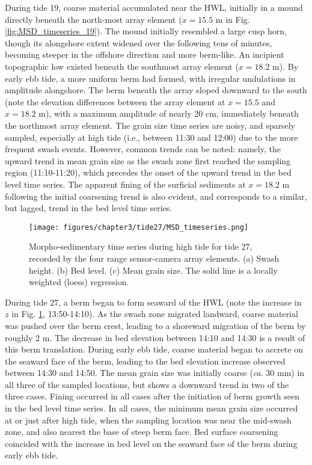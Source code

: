 During tide 19, coarse material accumulated near the HWL, initially in a mound directly beneath the north-most array element ($x=15.5$ m in Fig. \ref{fig:MSD_timeseries_19}). The mound initially resembled a large cusp horn, though its alongshore extent widened over the following tens of minutes, becoming steeper in the offshore direction and more berm-like. An incipient topographic low existed beneath the southmost array element ($x=18.2$ m). By early ebb tide, a more uniform berm had formed, with irregular undulations in amplitude alongshore. The berm beneath the array sloped downward to the south (note the elevation differences between the array element at $x=15.5$ and $x=18.2$ m), with a maximum amplitude of nearly 20 cm, immediately beneath the northmost array element. The grain size time series are noisy, and sparsely sampled, especially at high tide (i.e., between 11:30 and 12:00) due to the more frequent swash events. However, common trends can be noted: namely, the upward trend in mean grain size as the swash zone first reached the sampling region (11:10-11:20), which precedes the onset of the upward trend in the bed level time series. The apparent fining of the surficial sediments at $x=18.2$ m following the initial coarsening trend is also evident, and corresponds to a similar, but lagged, trend in the bed level time series.

\begin{figure}[tbp] %
  	\texttt{[image: figures/chapter3/tide27/MSD\_timeseries.png]}
 	\caption[Time series of swash zone bed level and mean grain size, tide 27]{Morpho-sedimentary time series during high tide for tide 27, recorded by the four range sensor-camera array elements. (a) Swash height. (b) Bed level. (c) Mean grain size. The solid line is a locally weighted (loess) regression.}
 	\label{fig:MSD_timeseries_27}
\end{figure}

During tide 27, a berm began to form seaward of the HWL (note the increase in $z$ in Fig. \ref{fig:MSD_timeseries_27}, 13:50-14:10). As the swash zone migrated landward, coarse material was pushed over the berm crest, leading to a shoreward migration of the berm by roughly 2 m. The decrease in bed elevation between 14:10 and 14:30 is a result of this berm translation. During early ebb tide, coarse material began to accrete on the seaward face of the berm, leading to the bed elevation increase observed between 14:30 and 14:50. The mean grain size was initially coarse (\textit{ca}. 30 mm) in all three of the sampled locations, but shows a downward trend in two of the three cases. Fining occurred in all cases after the initiation of berm growth seen in the bed level time series. In all cases, the minimum mean grain size occurred at or just after high tide, when the sampling location was near the mid-swash zone, and also nearest the base of steep berm face. Bed surface coarsening coincided with the increase in bed level on the seaward face of the berm during early ebb tide.

